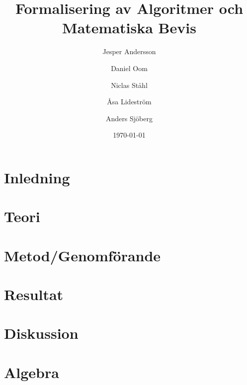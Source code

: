 \documentclass[a4paper]{article}
\title{Formalisering av Algoritmer och Matematiska Bevis}
\author[1]{Jesper Andersson}
\author[1]{Daniel Oom}
\author[1]{Niclas Ståhl}
\author[2]{Åsa Lideström}
\author[2]{Anders Sjöberg}
\affil[1]{Datateknik, Chalmers}
\affil[2]{Mattematik, Göteborgs Universitet}
\date{\today}
\begin{document}
\begin{abstract}
\end{abstract}

\maketitle
\thispagestyle{empty}
\newpage
\tableofcontents
\newpage

\section{Inledning}

\section{Teori}




\section{Metod/Genomförande}

\section{Resultat}

\section{Diskussion}


\printbibliography

\appendix
\section{Algebra}

\end{document}
